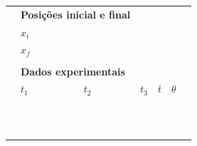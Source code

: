 \begin{table}[!h]
\centering
\begin{tabular}{lp{25mm}p{25mm}p{25mm}p{25mm}p{25mm}l}
\toprule
	& \multicolumn{2}{l}{\textbf{Posições inicial e final}} \\
	\cmidrule{2-3}
	& $x_i$ \cellcolor[gray]{0.89} & \cellcolor[gray]{0.92} \\
	& $x_f$ \cellcolor[gray]{0.95} & \cellcolor[gray]{0.97} \\
	\cmidrule{2-3}
\\
	& \multicolumn{6}{l}{\textbf{Dados experimentais}} \\
	\cmidrule{2-6}
	& $t_1$ & $t_2$ & $t_3$ & $\overline{t}$ & $\theta$ & \\
	\cmidrule{2-6}
	& \cellcolor[gray]{0.89} & \cellcolor[gray]{0.92} & \cellcolor[gray]{0.89} & \cellcolor[gray]{0.92} & \cellcolor[gray]{0.89} \\
	& \cellcolor[gray]{0.95} & \cellcolor[gray]{0.97} & \cellcolor[gray]{0.95} & \cellcolor[gray]{0.97} & \cellcolor[gray]{0.95} \\
	& \cellcolor[gray]{0.89} & \cellcolor[gray]{0.92} & \cellcolor[gray]{0.89} & \cellcolor[gray]{0.92} & \cellcolor[gray]{0.89} \\
	& \cellcolor[gray]{0.95} & \cellcolor[gray]{0.97} & \cellcolor[gray]{0.95} & \cellcolor[gray]{0.97} & \cellcolor[gray]{0.95} \\
	& \cellcolor[gray]{0.89} & \cellcolor[gray]{0.92} & \cellcolor[gray]{0.89} & \cellcolor[gray]{0.92} & \cellcolor[gray]{0.89} \\
	& \cellcolor[gray]{0.95} & \cellcolor[gray]{0.97} & \cellcolor[gray]{0.95} & \cellcolor[gray]{0.97} & \cellcolor[gray]{0.95} \\
	& \cellcolor[gray]{0.89} & \cellcolor[gray]{0.92} & \cellcolor[gray]{0.89} & \cellcolor[gray]{0.92} & \cellcolor[gray]{0.89} \\
	& \cellcolor[gray]{0.95} & \cellcolor[gray]{0.97} & \cellcolor[gray]{0.95} & \cellcolor[gray]{0.97} & \cellcolor[gray]{0.95} \\
	& \cellcolor[gray]{0.89} & \cellcolor[gray]{0.92} & \cellcolor[gray]{0.89} & \cellcolor[gray]{0.92} & \cellcolor[gray]{0.89} \\
	& \cellcolor[gray]{0.95} & \cellcolor[gray]{0.97} & \cellcolor[gray]{0.95} & \cellcolor[gray]{0.97} & \cellcolor[gray]{0.95} \\
	& \cellcolor[gray]{0.89} & \cellcolor[gray]{0.92} & \cellcolor[gray]{0.89} & \cellcolor[gray]{0.92} & \cellcolor[gray]{0.89} \\

\end{tabular}
\end{table}
